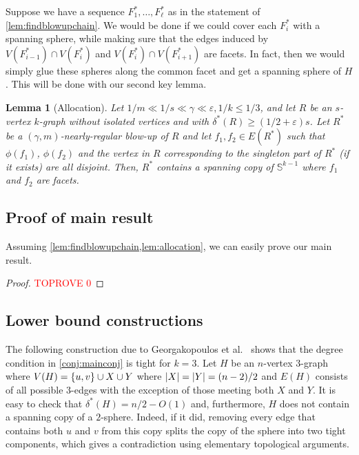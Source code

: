 \documentclass[12pt,reqno]{amsart}
\theoremstyle{plain}
\newtheorem{lemma}[theorem]{Lemma}
\theoremstyle{definition}
\numberwithin{equation}{section}
\DeclarePairedDelimiter{\abs}{\lvert}{\rvert}
\DeclarePairedDelimiter{\set}{\{}{\}}
\renewcommand{\ge}{\geqslant}
\renewcommand{\leq}{\leqslant}
\newcommand{\eps}{\varepsilon}
\newcommand{\comin}{\delta^{\ast}}
\newcommand{\bS}{\mathbb{S}}
\begin{document}
	Suppose we have a sequence $F_1^\ast, \dotsc, F_\ell^\ast$ as in the statement of \cref{lem:findblowupchain}.
	We would be done if we could cover each $F_i^\ast$ with a spanning sphere, while making sure that the edges induced by $V(F_{i-1}^\ast)\cap V(F_{i}^\ast)$ and $V(F_{i}^\ast)\cap V(F_{i+1}^\ast)$ are facets.
	In fact, then we would simply glue these spheres along the common facet and get a spanning sphere of $H$.
	This will be done with our second key lemma.
	
	\begin{lemma}[Allocation]\label{lem:allocation}
		Let $1/m\ll 1/s\ll \gamma \ll \eps, 1/k\leq 1/3$, and let $R$ be an $s$-vertex $k$-graph without isolated vertices and with $\comin(R) \ge (1/2 + \eps)s$. Let $R^\ast$ be a $(\gamma, m)$-nearly-regular blow-up of $R$ and let $f_1, f_2 \in E(R^\ast)$ such that $\phi(f_1)$, $\phi(f_2)$ and the vertex in $R$ corresponding to the singleton part of $R^\ast$ \textup{(}if it exists\textup{)} are all disjoint. Then, $R^\ast$ contains a spanning copy of $\bS^{k - 1}$ where $f_1$ and $f_2$ are facets.
	\end{lemma}
	
	
	\subsection{Proof of main result}
	
	Assuming \cref{lem:findblowupchain,lem:allocation}, we can easily prove our main result.
	
	\begin{proof}\textcolor{red}{TOPROVE 0}\end{proof}
	
	\subsection{Lower bound constructions}\label{sec:constructions}
	
	The following construction due to Georgakopoulos et al.~\cite{georgakopoulos2022spanning} shows that the degree condition in \cref{conj:mainconj} is tight for $k=3$.
	Let $H$ be an $n$-vertex $3$-graph where $V(H) = \set{u,v}\cup X \cup Y$ where $\abs{X} = \abs{Y} = (n-2)/2$ and $E(H)$ consists of all possible $3$-edges with the exception of those meeting both $X$ and $Y$. It is easy to check that $\comin(H) = n/2-O(1)$ and, furthermore, $H$ does not contain a spanning copy of a $2$-sphere. Indeed, if it did, removing every edge that contains both $u$ and $v$ from this copy splits the copy of the sphere into two tight components, which gives a contradiction using elementary topological arguments.
	
\end{document}
